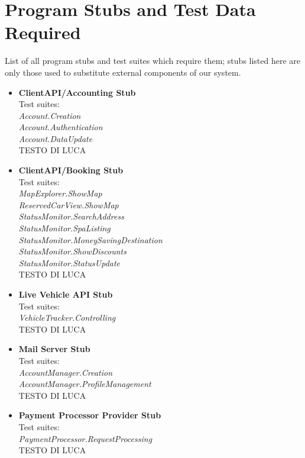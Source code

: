 \section{Program Stubs and Test Data Required}

List of all program stubs and test suites which require them; stubs listed here are only those used to substitute external components of our system.\\

 \begin{itemize}

    \item \textbf{ClientAPI/Accounting Stub}\\
        Test suites:\\\textit{Account.Creation\\
Account.Authentication\\Account.DataUpdate\\}
        TESTO DI LUCA
    \item \textbf{ClientAPI/Booking Stub}\\
        Test suites:\\\textit{MapExplorer.ShowMap\\ReservedCarView.ShowMap\\StatusMonitor.SearchAddress\\StatusMonitor.SpaListing\\StatusMonitor.MoneySavingDestination\\StatusMonitor.ShowDiscounts\\StatusMonitor.StatusUpdate\\}
        TESTO DI LUCA
    \item \textbf{Live Vehicle API Stub}\\
        Test suites:\\\textit{VehicleTracker.Controlling\\}
        TESTO DI LUCA
    \item \textbf{Mail Server Stub}\\
        Test suites:\\\textit{AccountManager.Creation\\AccountManager.ProfileManagement\\}
        TESTO DI LUCA
    \item \textbf{Payment Processor Provider Stub}\\
        Test suites:\\\textit{PaymentProcessor.RequestProcessing\\}
        TESTO DI LUCA
\end{itemize}



